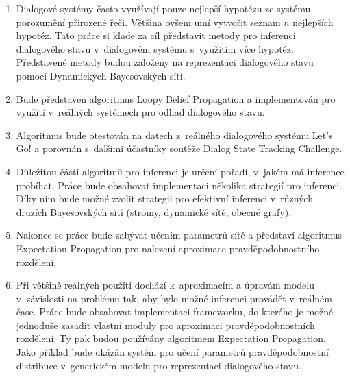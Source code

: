 \begin{enumerate}
\item Dialogové systémy často využívají pouze nejlepší hypotézu ze systému porozumění přirozené řeči.
    Většina ovšem umí vytvořit seznam $n$ nejlepších hypotéz.
    Tato práce si klade za cíl představit metody pro inferenci dialogového stavu v~dialogovém systému s~využitím více hypotéz.
    Představené metody budou založeny na reprezentaci dialogového stavu pomocí Dynamických Bayesovských sítí.
\item Bude představen algoritmus Loopy Belief Propagation a implementován pro využití v~reálných systémech pro odhad dialogového stavu.
\item Algoritmus bude otestován na datech z~reálného dialogového systému Let's Go! a porovnán s~dalšími účastníky soutěže Dialog State Tracking Challenge.
\item Důležitou částí algoritmů pro inferenci je určení pořadí, v~jakém má inference probíhat.
    Práce bude obsahovat implementaci několika strategií pro inferenci. Díky nim bude možné zvolit strategii pro efektivní inferenci v~různých druzích Bayesovských sítí (stromy, dynamické sítě, obecné grafy).
\item Nakonec se práce bude zabývat učením parametrů sítě a představí algoritmus Expectation Propagation pro nalezení aproximace pravděpodobnostního rozdělení.
\item Při většině reálných použití dochází k~aproximacím a úpravám modelu v~závislosti na problému tak, aby bylo možné inferenci provádět v~reálném čase.
Práce bude obsahovat implementaci frameworku, do kterého je možné jednoduše zasadit vlastní moduly pro aproximaci pravděpodobnostních rozdělení.
Ty pak budou používány algoritmem Expectation Propagation.
Jako příklad bude ukázán systém pro učení parametrů pravděpodobnostní distribuce v~generickém modelu pro reprezentaci dialogového stavu.
\end{enumerate}
